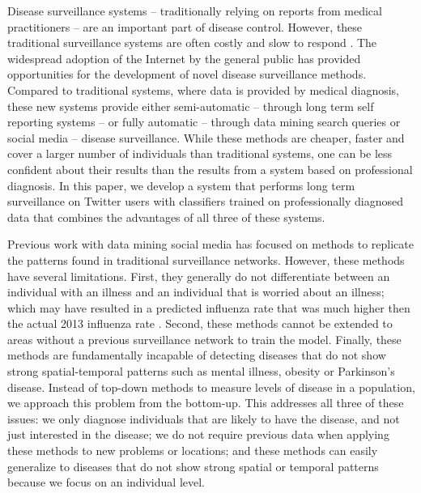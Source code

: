 \documentclass{acm_proc_article-sp}
\begin{document}
Disease surveillance systems -- traditionally relying on reports from medical practitioners -- are an important part of disease control. However, these traditional surveillance systems are often costly and slow to respond \cite{Heymann:2001,Chan2010,Salathe:2012ez}.  The widespread adoption of the Internet by the general public has provided opportunities for the development of novel disease surveillance methods. Compared to traditional systems, where data is provided by medical diagnosis, these new systems provide either semi-automatic -- through long term self reporting systems\cite{Marquet:2005tb,VanNoort:2007uk} -- or fully automatic -- through data mining search queries or social media\cite{Bodnar:2013we,Culotta:2010hx,Goel:2010jf,Butler:2013uh,Olson:2013bo} -- disease surveillance. While these methods are cheaper, faster and cover a larger number of individuals than traditional systems, one can be less confident about their results than the results from a system based on professional diagnosis. In this paper, we develop a system that performs long term surveillance on Twitter users with classifiers trained on professionally diagnosed data that combines the advantages of all three of these systems.

Previous work with data mining social media has focused on methods to replicate the patterns found in traditional surveillance networks\cite{Bodnar:2013we,Culotta:2010hx,Goel:2010jf}. However, these methods have several limitations. First, they generally do not differentiate between an individual with an illness and an individual that is worried about an illness; which may have resulted in a predicted influenza rate that was much higher then the actual 2013 influenza rate \cite{Bodnar:2013we,Butler:2013uh,Olson:2013bo,Lamb:2013to}. Second, these methods cannot be extended to areas without a previous surveillance network to train the model. Finally, these methods are fundamentally incapable of detecting diseases that do not show strong spatial-temporal patterns such as mental illness, obesity or Parkinson's disease. Instead of top-down methods to measure levels of disease in a population, we approach this problem from the bottom-up. This addresses all three of these issues: we only diagnose individuals that are likely to have the disease, and not just interested in the disease; we do not require previous data when applying these methods to new problems or locations; and these methods can easily generalize to diseases that do not show strong spatial or temporal patterns because we focus on an individual level.
\end{document}
